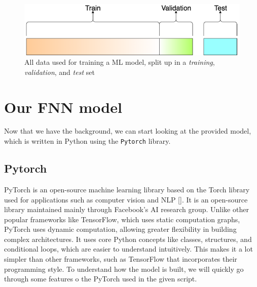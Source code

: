 \begin{figure}
  \centering
  \includegraphics[width=0.5\linewidth]{Pictures/splitdata.png}
  \caption{All data used for training a ML model, split up in a \emph{training}, \emph{validation}, and \emph{test} set}
  \label{fig:fnn}
\end{figure}

\newpage

\section{Our FNN model}
Now that we have the background, we can start looking at the provided model, which is written in Python using the \texttt{Pytorch} library. 
\subsection{Pytorch}

PyTorch is an open-source machine learning library based on the Torch library used for applications such as computer vision and NLP [\cite{pybook}]. It is an open-source library maintained mainly through Facebook’s AI research group.
Unlike other popular frameworks like TensorFlow, which uses static computation graphs, PyTorch uses dynamic computation, allowing greater flexibility in building complex architectures. It uses core Python concepts like classes, structures, and conditional loops, which are easier to understand intuitively. This makes it a lot simpler than other frameworks, such as TensorFlow that incorporates their programming style.
To understand how the model is built, we will quickly go through some features o the PyTorch used in the given script. \\


